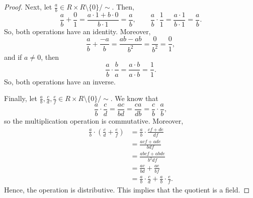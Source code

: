 \documentclass[a4paper, openany]{memoir}
\theoremstyle{definition}
\theoremstyle{plain}
\begin{document}
\begin{proof}
        Next, let $\frac{a}{b} \in R \times R \setminus \{0\} / {\sim}$. Then,
        \[\frac{a}{b} + \frac{0}{1} = \frac{a \cdot 1 + b \cdot 0}{b \cdot 1} = \frac{a}{b}, \qquad \frac{a}{b} \cdot \frac{1}{1} = \frac{a \cdot 1}{b \cdot 1} = \frac{a}{b}.\]
        So, both operations have an identity. Moreover, 
        \[\frac{a}{b} + \frac{-a}{b} = \frac{ab - ab}{b^2} = \frac{0}{b^2} = \frac{0}{1},\]
        and if $a \neq 0$, then
        \[\frac{a}{b} \cdot \frac{b}{a} = \frac{a \cdot b}{a \cdot b} = \frac{1}{1}.\]
        So, both operations have an inverse. 

        Finally, let $\frac{a}{b}, \frac{c}{d}, \frac{e}{f} \in R \times R \setminus \{0\} / {\sim}$. We know that
        \[\frac{a}{b} \cdot \frac{c}{d} = \frac{ac}{bd} = \frac{ca}{db} = \frac{c}{b} \cdot \frac{a}{b},\]
        so the multiplication operation is commutative. Moreover,
        \begin{align*}
            \frac{a}{b} \cdot \left(\frac{c}{d} + \frac{e}{f}\right) &= \frac{a}{b} \cdot \frac{cf + de}{df} \\
            &= \frac{acf + ade}{bdf} \\
            &= \frac{abcf + abde}{b^2df} \\
            &= \frac{ac}{bd} + \frac{ae}{bf} \\
            &= \frac{a}{b} \cdot \frac{c}{d} + \frac{a}{b} \cdot \frac{e}{f}.
        \end{align*}
        Hence, the operation is distributive. This implies that the quotient is a field.
    \end{proof}
\end{document}
